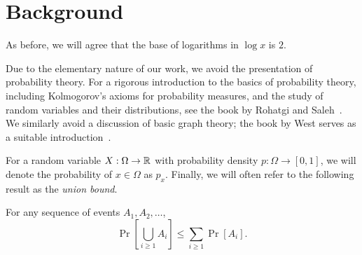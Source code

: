 \chapter{Background}


As before, we will agree that the base of logarithms in $\log x$ is
$2$.


Due to the elementary nature of our work, we avoid the presentation of
probability theory. For a rigorous introduction to the basics of
probability theory, including Kolmogorov's axioms for probability
measures, and the study of random variables and their distributions,
see the book by Rohatgi and Saleh~\cite{rohatgi:probability}. We
similarly avoid a discussion of basic graph theory; the book by West
serves as a suitable introduction~\cite{west:graphtheory}.

For a random variable $X : \Omega \to \mathbb{R}$ with probability density
$p : \Omega \to [0, 1]$, we will denote the probability of
$x \in \Omega$ as $p_x$. Finally, we will often refer to the following
result as the \emph{union bound}.
\begin{lem}
  For any sequence of events $A_1, A_2, \ldots$,
  \[
  \Pr\left[\bigcup_{i \geq 1} A_i\right] \leq \sum_{i \geq 1}
  \Pr[A_i].
  \]
\end{lem}


